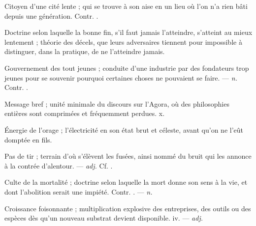  Citoyen d'une cité lente ; qui se trouve à son aise en un lieu où l'on n'a rien bâti depuis une génération. Contr. .

 Doctrine selon laquelle la bonne fin, s'il faut jamais l'atteindre, s'atteint au mieux lentement ; théorie des décels, que leurs adversaires tiennent pour impossible à distinguer, dans la pratique, de ne l'atteindre jamais.

  Gouvernement des tout jeunes ; conduite d'une industrie par des fondateurs trop jeunes pour se souvenir pourquoi certaines choses ne pouvaient se faire.  ---  \textit{n.} Contr. .

 Message bref ; unité minimale du discours sur l'Agora, où des philosophies entières sont comprimées et fréquemment perdues.   x.

 Énergie de l'orage ; l'électricité en son état brut et céleste, avant qu'on ne l'eût domptée en fils.  

 Pas de tir ; terrain d'où s'élèvent les fusées, ainsi nommé du bruit qui les annonce à la contrée d'alentour. ---  \textit{adj.} Cf. .

 Culte de la mortalité ; doctrine selon laquelle la mort donne son sens à la vie, et dont l'abolition serait une impiété. Contr. . ---  \textit{n.}

 Croissance foisonnante ; multiplication explosive des entreprises, des outils ou des espèces dès qu'un nouveau substrat devient disponible.   iv. ---  \textit{adj.}

